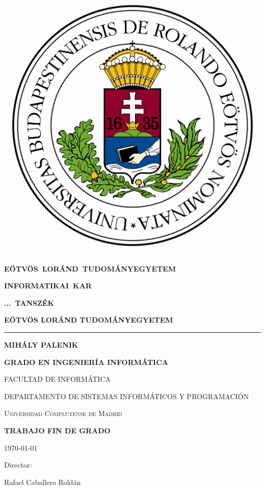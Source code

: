\documentclass[]{book}
\begin{document}
\begin{titlepage}
   \begin{minipage}{0.3\linewidth}
      \includegraphics[width=\linewidth]{elte-logo}
   \end{minipage}
   \begin{minipage}[c]{0.7\linewidth}
      \centering
      \mbox{\bfseries\large EÖTVÖS LORÁND TUDOMÁNYEGYETEM}\par
      \mbox{\bfseries\large INFORMATIKAI KAR}\par
      \mbox{\bfseries\large ... TANSZÉK}
   \end{minipage}



  {\bfseries\Large EÖTVÖS LORÁND TUDOMÁNYEGYETEM \par}
  \rule{\linewidth}{0.5mm}\par
  \vspace{2cm}
  {\bfseries\large MIHÁLY PALENIK \par}
  \vspace{1.5cm}
  \centering
  {\bfseries\normalsize GRADO EN INGENIERÍA INFORMÁTICA \par
  FACULTAD DE INFORMÁTICA \par
  DEPARTAMENTO DE SISTEMAS INFORMÁTICOS Y PROGRAMACIÓN \par}
  {\scshape\large Universidad Complutense de Madrid\par}
  {\bfseries\normalsize TRABAJO FIN DE GRADO \par}
  \vspace{0.5cm}
  {\large \today\par}

  \vfill
  Director:\par
  Rafael Caballero Roldán

  \vfill


\end{titlepage}
\end{document}
